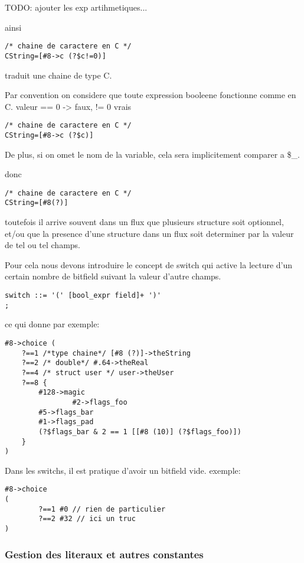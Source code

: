 \documentclass[11pt]{report}
\begin{document}
TODO: ajouter les exp artihmetiques...

ainsi

\begin{lstlisting}
/* chaine de caractere en C */
CString=[#8->c (?$c!=0)] 
\end{lstlisting}%

traduit une chaine de type C.

Par convention on considere que toute expression booleene fonctionne comme en C. valeur == 0 -> faux, != 0 vrais

\begin{lstlisting}
/* chaine de caractere en C */
CString=[#8->c (?$c)] 
\end{lstlisting} %

De plus, si on omet le nom de la variable, cela sera implicitement comparer a \$\_.

donc

\begin{lstlisting}
/* chaine de caractere en C */
CString=[#8(?)]
\end{lstlisting}


toutefois il arrive souvent dans un flux que plusieurs structure soit optionnel,
et/ou que la presence d'une structure dans un flux soit determiner par la valeur
de tel ou tel champs.

Pour cela nous devons introduire le concept de switch qui active la lecture d'un certain nombre de bitfield suivant 
la valeur d'autre champs.

\begin{lstlisting}
switch ::= '(' [bool_expr field]+ ')'
;
\end{lstlisting}

ce qui donne par exemple:

\begin{lstlisting}
#8->choice (
	?==1 /*type chaine*/ [#8 (?)]->theString
	?==2 /* double*/ #.64->theReal
	?==4 /* struct user */ user->theUser
	?==8 {
		#128->magic
                #2->flags_foo
		#5->flags_bar
		#1->flags_pad
		(?$flags_bar & 2 == 1 [[#8 (10)] (?$flags_foo)]) 
	}
)
\end{lstlisting} %

Dans les switchs, il est pratique d'avoir un bitfield vide.
exemple:
\begin{lstlisting}
#8->choice 
(
        ?==1 #0 // rien de particulier
        ?==2 #32 // ici un truc
)
\end{lstlisting} 

\subsubsection{Gestion des literaux et autres constantes}
\end{document}

